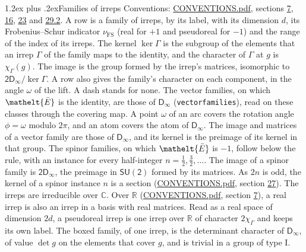 \documentclass[10pt,a4paper]{article}
\makeatletter
\renewcommand\section{\@startsection{section}{1}{\z@}{-3ex plus -1ex minus -.2ex}%
  {1.2ex plus .2ex}{\normalfont\large\sffamily\bfseries\color{parttitle}}}
\numberwithin{equation}{section}
\newcommand{\eltfont}[1]{{\let\sigma\eltsigma\mathelt{#1}}}
\newcommand{\grp}[1]{\mathsf{#1}}
\newcommand{\elt}[1]{\eltfont{#1}}
\newcommand{\irchar}[1]{\chi_{#1}}
\newcommand{\fsind}{\nu_{\mathrm{FS}}}
\newcommand{\barred}[1]{\bar{#1}}
\makeatother
\begin{document}
\section{Families of irreps}\label{s:families}
Conventions: \href{../../CONVENTIONS.pdf}{CONVENTIONS.pdf}, sections \href{../../../rotation/CONVENTIONS.pdf\#conv.7}{7}, \href{../../../rotation/CONVENTIONS.pdf\#conv.16}{16}, \href{../../CONVENTIONS.pdf\#conv.23}{23} and \href{../../CONVENTIONS.pdf\#conv.29.2}{29.2}.
\leavevmode\label{n:head.family.irreps}\label{n:index.dimension}\label{n:index.frobenius}\label{n:head.index.family}A row is a family of irreps, by its label, with its dimension $d$, its Frobenius--Schur indicator $\fsind$ (real for $+1$ and pseudoreal for $-1$) and the range of the index of its irreps. \label{n:head.kernel}\label{n:function.character}The kernel $\ker\Gamma$ is the subgroup of the elements that an irrep $\Gamma$ of the family maps to the identity, and the character of $\Gamma$ at $g$ is $\irchar{\Gamma}(g)$. \label{n:head.image}The image is the group formed by the irrep's matrices, isomorphic to $\grp{2D_{\infty }}/\ker\Gamma$. A row also gives the family's character on each component, in the angle $\omega$ of the lift. A dash stands for none. The vector families, on which $\elt{\barred{E}}$ is the identity, are those of \href{../../../rotation/data/pdf/Dinf.pdf}{$\grp{D_{\infty}}$} (\texttt{vectorfamilies}), read on these classes through the covering map. A point $\omega$ of an arc covers the rotation angle $\phi = \omega$ modulo $2\pi$, and an atom covers the atom of \href{../../../rotation/data/pdf/Dinf.pdf}{$\grp{D_{\infty}}$}. The image and matrices of a vector family are those of \href{../../../rotation/data/pdf/Dinf.pdf}{$\grp{D_{\infty}}$}, and its kernel is the preimage of its kernel in that group. The spinor families, on which $\elt{\barred{E}}$ is $-1$, follow below the rule, with an instance for every half-integer $n = \tfrac{1}{2}, \tfrac{3}{2}, \dots$. The image of a spinor family is \href{2Dinf.pdf}{$\grp{2D_{\infty }}$}, the preimage in $\grp{SU(2)}$ formed by its matrices. As $2n$ is odd, the kernel of a spinor instance $n$ is a section (\href{../../CONVENTIONS.pdf}{CONVENTIONS.pdf}, section \href{../../CONVENTIONS.pdf\#conv.27}{27}). The irreps are irreducible over $\mathbb{C}$. Over $\mathbb{R}$ (\href{../../CONVENTIONS.pdf}{CONVENTIONS.pdf}, section \href{../../../rotation/CONVENTIONS.pdf\#conv.7}{7}), a real irrep is also an irrep in a basis with real matrices. Read as a real space of dimension $2d$, a pseudoreal irrep is one irrep over $\mathbb{R}$ of character $2\irchar{\Gamma}$ and keeps its own label. \label{n:mark.determinant}The boxed family, of one irrep, is the determinant character of \href{../../../rotation/data/pdf/Dinf.pdf}{$\grp{D_{\infty}}$}, of value $\det g$ on the elements that cover $g$, and is trivial in a group of type I.
\end{document}
